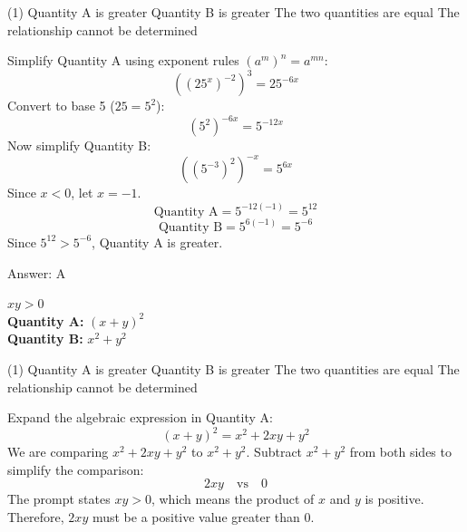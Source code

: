 \documentclass[11pt,paper=a4,answers]{exam}
\begin{document}
\begin{questions}
\begin{tasks}(1)
\task[A)] Quantity A is greater
\task[B)] Quantity B is greater
\task[C)] The two quantities are equal
\task[D)] The relationship cannot be determined
\end{tasks}

\begin{solution}
Simplify Quantity A using exponent rules $(a^m)^n = a^{mn}$:
\vspace{5pt}
\[ ((25^x)^{-2})^3 = 25^{-6x} \]
\vspace{5pt}
Convert to base 5 ($25 = 5^2$):
\vspace{5pt}
\[ (5^2)^{-6x} = 5^{-12x} \]
\vspace{5pt}
Now simplify Quantity B:
\vspace{5pt}
\[ ((5^{-3})^2)^{-x} = 5^{6x} \]
\vspace{5pt}
Since $x < 0$, let $x = -1$.
\vspace{5pt}
\[ \text{Quantity A} = 5^{-12(-1)} = 5^{12} \]
\vspace{5pt}
\[ \text{Quantity B} = 5^{6(-1)} = 5^{-6} \]
\vspace{5pt}
Since $5^{12} > 5^{-6}$, Quantity A is greater.

Answer: \colorbox{yellow!100}{A}
\end{solution}

\vspace{1cm}

\question
$xy > 0$
\\[0.3cm]
\textbf{Quantity A: } $(x + y)^2$ \\
\textbf{Quantity B: } $x^2 + y^2$

\begin{tasks}(1)
\task[A)] Quantity A is greater
\task[B)] Quantity B is greater
\task[C)] The two quantities are equal
\task[D)] The relationship cannot be determined
\end{tasks}

\begin{solution}
Expand the algebraic expression in Quantity A:
\vspace{5pt}
\[ (x + y)^2 = x^2 + 2xy + y^2 \]
\vspace{5pt}
We are comparing $x^2 + 2xy + y^2$ to $x^2 + y^2$.
\vspace{5pt}
Subtract $x^2 + y^2$ from both sides to simplify the comparison:
\vspace{5pt}
\[ 2xy \quad \text{vs} \quad 0 \]
\vspace{5pt}
The prompt states $xy > 0$, which means the product of $x$ and $y$ is positive.
\vspace{5pt}
Therefore, $2xy$ must be a positive value greater than 0.


\end{solution}
\end{questions}
\end{document}
